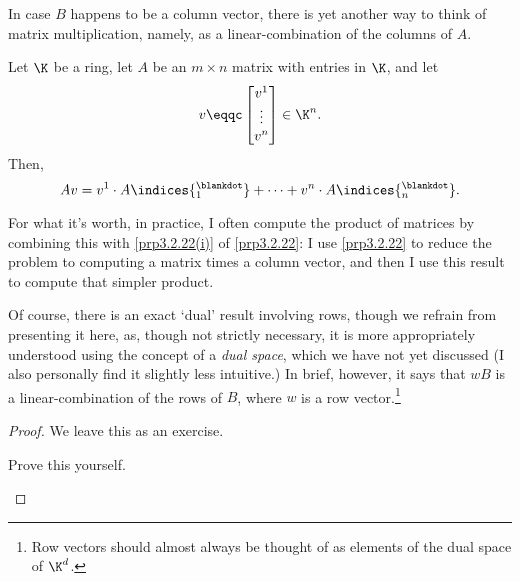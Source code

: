 In case $B$ happens to be a column vector, there is yet another way to think of matrix multiplication, namely, as a linear-combination of the columns of $A$.
\begin{prp}{}{}
	Let $\K$ be a ring, let $A$ be an $m\times n$ matrix with entries in $\K$, and let
	\begin{equation}
		v\eqqc \begin{bmatrix}v^1 \\ \vdots \\ v^n\end{bmatrix}\in \K ^n.
	\end{equation}
	Then,
	\begin{equation}
		Av=v^1\cdot A\indices{^{\blankdot}_1}+\cdots +v^n\cdot A\indices{^{\blankdot}_n}.
	\end{equation}
	\begin{rmk}
		For what it's worth, in practice, I often compute the product of matrices by combining this with \cref{prp3.2.22(i)} of \cref{prp3.2.22}:  I use \cref{prp3.2.22} to reduce the problem to computing a matrix times a column vector, and then I use this result to compute that simpler product.
	\end{rmk}
	\begin{rmk}
		Of course, there is an exact `dual' result involving rows, though we refrain from presenting it here, as, though not strictly necessary, it is more appropriately understood using the concept of a \emph{dual space}, which we have not yet discussed  (I also personally find it slightly less intuitive.)  In brief, however, it says that $wB$ is a linear-combination of the rows of $B$, where $w$ is a row vector.\footnote{Row vectors should almost always be thought of as elements of the dual space of $\K ^d$.}
	\end{rmk}
	\begin{proof}
		We leave this as an exercise.
		\begin{exr}[breakable=false]{}{}
			Prove this yourself.
		\end{exr}
	\end{proof}
\end{prp}

